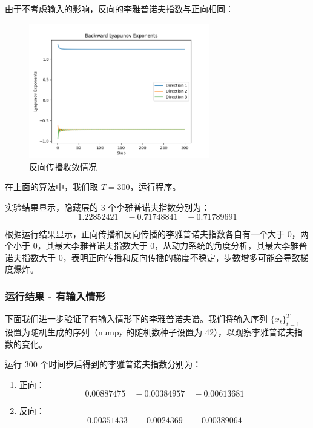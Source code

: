 由于不考虑输入的影响，反向的李雅普诺夫指数与正向相同：

\begin{figure}[htbp]
  \centering
  \includegraphics[width=0.7\textwidth]{figures/lyapunov_exponents_backward.png}
  \caption{反向传播收敛情况}
  \label{fig:example}
\end{figure}

在上面的算法中，我们取 $T=300$，运行程序。

实验结果显示，隐藏层的 3 个李雅普诺夫指数分别为：
\begin{equation}
  1.22852421\quad-0.71748841\quad-0.71789691
\end{equation}

根据运行结果显示，正向传播和反向传播的李雅普诺夫指数各自有一个大于 0，两个小于 0，其最大李雅普诺夫指数大于 0，从动力系统的角度分析，其最大李雅普诺夫指数大于 0，表明正向传播和反向传播的梯度不稳定，步数增多可能会导致梯度爆炸。

\subsubsection{运行结果 - 有输入情形}

下面我们进一步验证了有输入情形下的李雅普诺夫谱。我们将输入序列 $\{x_t\}_{t=1}^T$ 设置为随机生成的序列（numpy 的随机数种子设置为 42），以观察李雅普诺夫指数的变化。

运行 300 个时间步后得到的李雅普诺夫指数分别为：

\begin{enumerate}
  \item 正向：
  \begin{equation}
    0.00887475\quad-0.00384957\quad-0.00613681
  \end{equation}
  \item 反向：
  \begin{equation}
    0.00351433\quad-0.0024369\quad-0.00389064
  \end{equation}
\end{enumerate}

